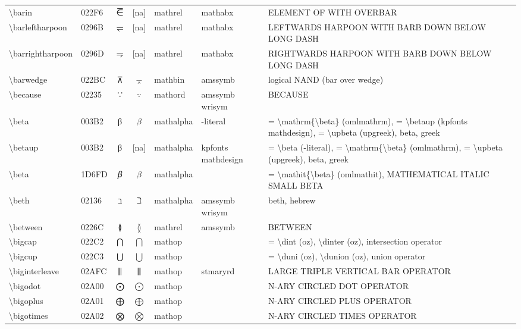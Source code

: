 \documentclass[a4paper,landscape]{article}
\begin{document}
\begin{longtable}{llcclll}
\textbackslash{}barin & 022F6 & ⋶ & [na] & mathrel & mathabx & ELEMENT OF WITH OVERBAR \\
\textbackslash{}barleftharpoon & 0296B & ⥫ & [na] & mathrel & mathabx & LEFTWARDS HARPOON WITH BARB DOWN BELOW LONG DASH \\
\textbackslash{}barrightharpoon & 0296D & ⥭ & [na] & mathrel & mathabx & RIGHTWARDS HARPOON WITH BARB DOWN BELOW LONG DASH \\
\textbackslash{}barwedge & 022BC & ⊼ & $\barwedge$ & mathbin & amssymb & logical NAND (bar over wedge) \\
\textbackslash{}because & 02235 & ∵ & $\because$ & mathord & amssymb wrisym & BECAUSE \\
\textbackslash{}beta & 003B2 & β & $\beta$ & mathalpha & -literal & = \textbackslash{}mathrm\{\textbackslash{}beta\} (omlmathrm), = \textbackslash{}betaup (kpfonts mathdesign), = \textbackslash{}upbeta (upgreek), beta, greek \\
\textbackslash{}betaup & 003B2 & β & [na] & mathalpha & kpfonts mathdesign & = \textbackslash{}beta (-literal), = \textbackslash{}mathrm\{\textbackslash{}beta\} (omlmathrm),  = \textbackslash{}upbeta (upgreek),  beta,  greek \\
\textbackslash{}beta & 1D6FD & 𝛽 & $\beta$ & mathalpha &  & = \textbackslash{}mathit\{\textbackslash{}beta\} (omlmathit), MATHEMATICAL ITALIC SMALL BETA \\
\textbackslash{}beth & 02136 & ℶ & $\beth$ & mathalpha & amssymb wrisym & beth, hebrew \\
\textbackslash{}between & 0226C & ≬ & $\between$ & mathrel & amssymb & BETWEEN \\
\textbackslash{}bigcap & 022C2 & ⋂ & $\bigcap$ & mathop &  & = \textbackslash{}dint (oz), \textbackslash{}dinter (oz), intersection operator \\
\textbackslash{}bigcup & 022C3 & ⋃ & $\bigcup$ & mathop &  & = \textbackslash{}duni (oz), \textbackslash{}dunion (oz), union operator \\
\textbackslash{}biginterleave & 02AFC & ⫼ & $\biginterleave$ & mathop & stmaryrd & LARGE TRIPLE VERTICAL BAR OPERATOR \\
\textbackslash{}bigodot & 02A00 & ⨀ & $\bigodot$ & mathop &  & N-ARY CIRCLED DOT OPERATOR \\
\textbackslash{}bigoplus & 02A01 & ⨁ & $\bigoplus$ & mathop &  & N-ARY CIRCLED PLUS OPERATOR \\
\textbackslash{}bigotimes & 02A02 & ⨂ & $\bigotimes$ & mathop &  & N-ARY CIRCLED TIMES OPERATOR \\

\end{longtable}
\end{document}

